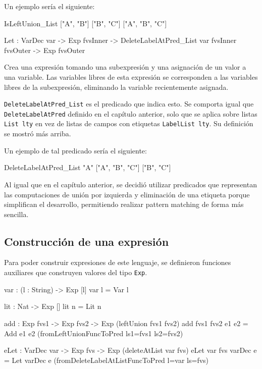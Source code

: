 Un ejemplo sería el siguiente:

\begin{code}
IsLeftUnion_List ["A", "B"] ["B", "C"]
  ["A", "B", "C"]
\end{code}

\begin{code}
Let : VarDec var -> Exp fvsInner ->
  DeleteLabelAtPred_List var fvsInner fvsOuter ->
  Exp fvsOuter
\end{code}

Crea una expresión tomando una subexpresión y una asignación de un valor a una variable. Las variables libres de esta expresión se corresponden a las variables libres de la subexpresión, eliminando la variable recientemente asignada.

\texttt{DeleteLabelAtPred\_List} es el predicado que indica esto. Se comporta igual que \texttt{DeleteLabelAtPred} definido en el capítulo anterior, solo que se aplica sobre listas \texttt{List lty} en vez de listas de campos con etiquetas \texttt{LabelList lty}. Su definición se mostró más arriba.

Un ejemplo de tal predicado sería el siguiente:

\begin{code}
DeleteLabelAtPred_List "A" ["A", "B", "C"]
  ["B", "C"]
\end{code}

Al igual que en el capítulo anterior, se decidió utilizar predicados que representan las computaciones de unión por izquierda y eliminación de una etiqueta porque simplifican el desarrollo, permitiendo realizar pattern matching de forma más sencilla.

\subsection{Construcción de una expresión}

Para poder construir expresiones de este lenguaje, se definieron funciones auxiliares que construyen valores del tipo \texttt{Exp}.

\begin{code}
var : (l : String) -> Exp [l]
var l = Var l

lit : Nat -> Exp []
lit n = Lit n

add : Exp fvs1 -> Exp fvs2 -> Exp (leftUnion fvs1 fvs2)
add {fvs1} {fvs2} e1 e2 = Add e1 e2
  (fromLeftUnionFuncToPred {ls1=fvs1} {ls2=fvs2})

eLet : VarDec var -> Exp fvs -> Exp (deleteAtList var fvs)
eLet {var} {fvs} varDec e = Let varDec e
  (fromDeleteLabelAtListFuncToPred {l=var} {ls=fvs})
\end{code}

